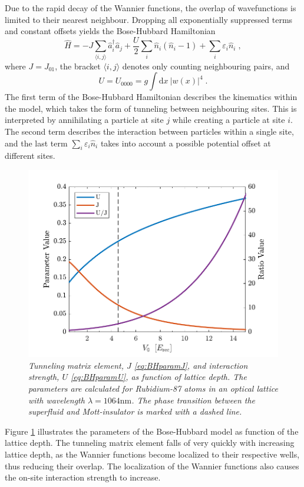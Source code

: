 Due to the rapid decay of the Wannier functions, the overlap of wavefunctions is limited to their nearest neighbour. Dropping all exponentially suppressed terms and constant offsets yields the Bose-Hubbard Hamiltonian
\begin{equation}
	\hat{H} = - J \sum_{\langle i,j \rangle} \hat{a}_{i}^{\dag} \hat{a}_{j} + \frac{U}{2} \sum_{i} \hat{n}_i \left( \hat{n}_i -1 \right) + \sum_{i} \varepsilon_i \hat{n}_i \; ,
	\label{BHhamil}
\end{equation}
where $J = J_{0 1}$, the bracket $\langle i,j \rangle$ denotes only counting neighbouring pairs, and
\begin{equation}
	U = U_{0 0 0 0} = g \int \mathrm{d}x \ |w(x)|^4 \; .
	\label{eq:BHparamU}
\end{equation}
The first term of the Bose-Hubbard Hamiltonian describes the kinematics within the model, which takes the form of tunneling between neighbouring sites. This is interpreted by annihilating a particle at site $j$ while creating a particle at site $i$. The second term describes the interaction between particles within a single site, and the last term $\sum_{i} \varepsilon_i \hat{n}_i$ takes into account a possible potential offset at different sites.
\begin{figure}[!h]
	\centering
	\includegraphics[width=0.7\columnwidth]{Figures/UJparameters.pdf} 
	\caption{\textit{Tunneling matrix element, $J$ \eqref{eq:BHparamJ}, and interaction strength, $U$ \eqref{eq:BHparamU}, as function of lattice depth. The parameters are calculated for Rubidium-87 atoms in an optical lattice with wavelength $\lambda = 1064 \mathrm{nm}$. The phase transition between the superfluid and Mott-insulator is marked with a dashed line.}}
	\label{fig:UJparameters} 
\end{figure}
Figure \ref{fig:UJparameters} illustrates the parameters of the Bose-Hubbard model as function of the lattice depth. The tunneling matrix element falls of very quickly with increasing lattice depth, as the Wannier functions become localized to their respective wells, thus reducing their overlap. The localization of the Wannier functions also causes the on-site interaction strength to increase.

